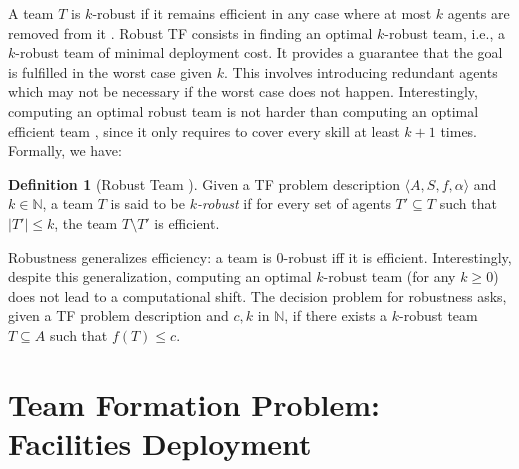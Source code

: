 \documentclass[conference]{IEEEtran}
\theoremstyle{definition}
\newtheorem{definition}{Definition}
\begin{document}
A team $T$ is $k$-robust if it remains efficient in any
case where at most $k$ agents are removed from it \cite{Okimoto2015}.
Robust TF consists in finding an optimal $k$-robust team, i.e., a
$k$-robust team of minimal deployment cost. It provides a
guarantee that the goal is fulfilled in the worst case given $k$.
This involves introducing redundant agents which may not be necessary if the worst case does not happen.
Interestingly, computing an optimal robust team is not harder than computing an optimal 
efficient team \cite{Okimoto2015}, since it only requires to cover every skill at least $k + 1$ times.
Formally, we have:

\begin{definition}[Robust Team \cite{Okimoto2015}]
	Given a TF problem description $\langle A, S, f, \alpha\rangle$ and  $k \in \mathbb{N}$, a team $T$
	is said to be \emph{$k$-robust} if for every set of agents $T' \subseteq T$ such that $|T'| \leq k$, the team $T \setminus T'$ is efficient.
	\label{def:TFrobust}
\end{definition}

Robustness generalizes efficiency: a team is $0$-robust iff it is efficient.
Interestingly, despite this generalization, computing an optimal $k$-robust team (for any $k \geq 0$) does not lead to a computational shift.
The decision problem for robustness asks, given a TF problem description and $c, k$ in $\mathbb{N}$,
if there exists a $k$-robust team $T \subseteq A$ such that $f(T) \leq c$. 


\section{Team Formation Problem: Facilities Deployment}
\end{document}
